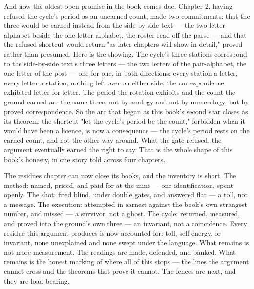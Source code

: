 And now the oldest open promise in the book comes due. Chapter 2, having refused the
cycle's period as an unearned count, made two commitments: that the three would be
earned instead from the side-by-side text --- the two-letter alphabet beside the
one-letter alphabet, the roster read off the parse --- and that the refused shortcut
would return "as later chapters will show in detail," proved rather than presumed.
Here is the showing. The cycle's three stations correspond to the side-by-side
text's three letters --- the two letters of the pair-alphabet, the one letter of the
post --- one for one, in both directions: every station a letter, every letter a
station, nothing left over on either side, the correspondence exhibited letter for
letter. The period the rotation exhibits and the count the ground earned are the
same three, not by analogy and not by numerology, but by proved correspondence. So
the arc that began as this book's second scar closes as its theorem: the shortcut
"let the cycle's period be the count," forbidden when it would have been a licence,
is now a consequence --- the cycle's period rests on the earned count, and not the
other way around. What the gate refused, the argument eventually earned the right
to say. That is the whole shape of this book's honesty, in one story told across
four chapters.

The residues chapter can now close its books, and the inventory is short. The
method: named, priced, and paid for at the mint --- one identification, spent
openly. The shot: fired blind, under double gates, and answered flat --- a toll,
not a message. The execution: attempted in earnest against the book's own
strangest number, and missed --- a survivor, not a ghost. The cycle: returned,
measured, and proved into the ground's own three --- an invariant, not a
coincidence. Every residue this argument produces is now accounted for: toll,
self-energy, or invariant, none unexplained and none swept under the language.
What remains is not more measurement. The readings are made, defended, and
banked. What remains is the honest marking of where all of this stops --- the
lines the argument cannot cross and the theorems that prove it cannot. The
fences are next, and they are load-bearing.
